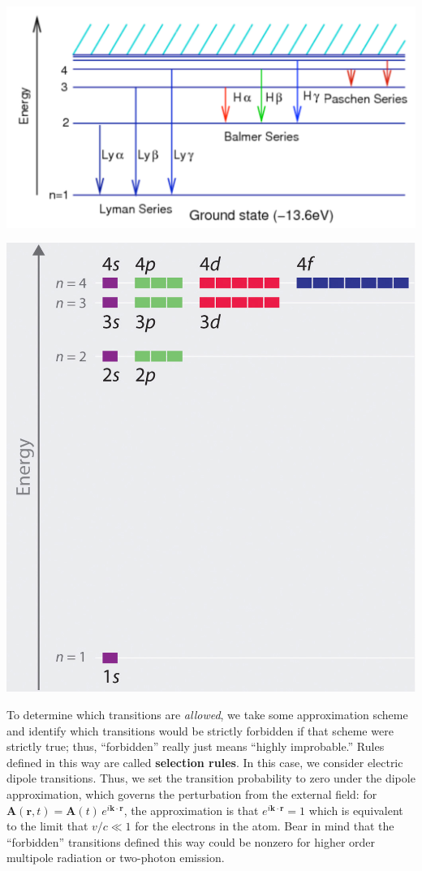 \documentclass[12pt, letterpaper, preprint]{aastex}
\begin{document}
\begin{enumerate}
\begin{center}
\includegraphics[scale=0.55]{hydrogen_atom_energy_levels.png}

\includegraphics[scale=0.25]{hydrogen-atom-orbitals.jpg}
\end{center}

To determine which transitions are \emph{allowed},
we take some approximation scheme and identify which transitions would be strictly forbidden if that scheme were strictly true; thus, ``forbidden'' really just means ``highly improbable.''
Rules defined in this way are called \textbf{selection rules}.
In this case, we consider electric dipole transitions.
Thus, we set the transition probability to zero under the dipole approximation, which governs the perturbation from the external field: for $\mathbf{A}(\mathbf{r},t) = \mathbf{A} (t) \, e^{i \mathbf{k} \cdot \mathbf{r}}$, the approximation is that $e^{i \mathbf{k} \cdot \mathbf{r}} = 1$ which is equivalent to the limit that $v/c \ll 1$ for the electrons in the atom.
Bear in mind that the ``forbidden'' transitions defined this way could be nonzero for higher order multipole radiation or two-photon emission. 


\end{enumerate}
\end{document}
